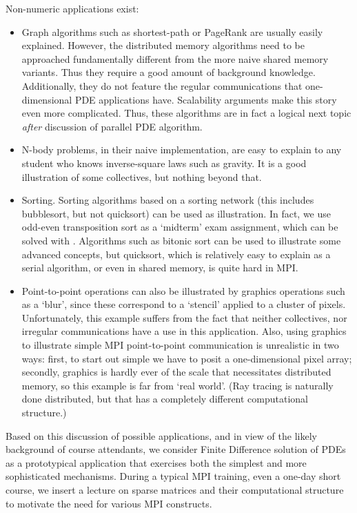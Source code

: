 Non-numeric applications exist:
\begin{itemize}
\item Graph algorithms such as shortest-path or PageRank are usually
  easily explained. However, the distributed memory algorithms need to
  be approached fundamentally different from the more naive shared
  memory variants. Thus they require a good amount of background
  knowledge. Additionally, they do not feature the regular
  communications that one-dimensional PDE applications
  have. Scalability arguments make this story even more
  complicated. Thus, these algorithms are in fact a logical next topic
  \emph{after} discussion of parallel PDE algorithm.
\item N-body problems, in their naive implementation, are easy to
  explain to any student who knows inverse-square laws such as
  gravity. It is a good illustration of some collectives, but nothing
  beyond that.
\item Sorting. Sorting algorithms based on a sorting network (this
  includes bubblesort, but not quicksort) can be used as
  illustration. In fact, we use odd-even transposition sort as a
  `midterm' exam assignment, which can be solved with
  . Algorithms such as bitonic sort can be used to
  illustrate some advanced concepts, but quicksort, which is
  relatively easy to explain as a serial algorithm, or even in shared
  memory, is quite hard in \ac{MPI}.
\item Point-to-point operations can also be illustrated by graphics
  operations such as a `blur', since these correspond to a `stencil'
  applied to a cluster of pixels. Unfortunately, this example suffers
  from the fact that neither collectives, nor irregular communications
  have a use in this application. Also, using graphics to illustrate
  simple \ac{MPI} point-to-point communication is unrealistic in two
  ways: first, to start out simple we have to posit a one-dimensional
  pixel array; secondly, graphics is hardly ever of the scale that
  necessitates distributed memory, so this example is far from `real
  world'. (Ray tracing is naturally done distributed, but that has a
  completely different computational structure.)
\end{itemize}

Based on this discussion of possible applications, and in view of the
likely background of course attendants, we consider Finite Difference
solution of \acp{PDE} as a prototypical application that exercises
both the simplest and more sophisticated mechanisms. During a typical
MPI training, even a one-day short course, we insert a lecture on
sparse matrices and their computational structure to motivate the need
for various MPI constructs.

